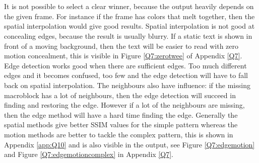\section[An answer, with explanation, to the following questions:]{}
\subsection[Can a clear winner be found among all techniques and groups of techniques? If so, what would be a possible reason for not choosing the best candidate
(thus, choosing another technique)? If not, which factors decide which technique is best?]{}
\subsection[When you do a visual inspection of the reconstructed sequences, do you get
the same results? If so, what conclusions can be drawn from this experiment? If not, what are the main differences and what can be concluded?]{}

It is not possible to select a clear winner, because the output heavily depends on the given frame. For instance if the frame has colors that melt together, then the spatial interpolation would give good results. Spatial interpolation is not good at concealing edges, because the result is usually blurry. If a static text is shown in front of a moving background, then the text will be easier to read with zero motion concealment, this is visible in Figure \ref{Q7:zerotwee} of Appendix \ref{Q7}. 
\npar
Edge detection works good when there are sufficient edges. Too much different edges and it becomes confused, too few and the edge detection will have to fall back on spatial interpolation. The neighbours also have influence: if the missing macroblock has a lot of neighbours, then the edge detection will succeed in finding and restoring the edge. However if a lot of the neighbours are missing, then the edge method will have a hard time finding the edge. 
\npar
Generally the spatial methods give better SSIM values for the simple pattern whereas the motion methods are better to tackle the complex pattern, this is shown in Appendix \ref{app:Q10} and is also visible in the output, see Figure \ref{Q7:edgemotion} and Figure \ref{Q7:edgemotioncomplex} in Appendix \ref{Q7}.

